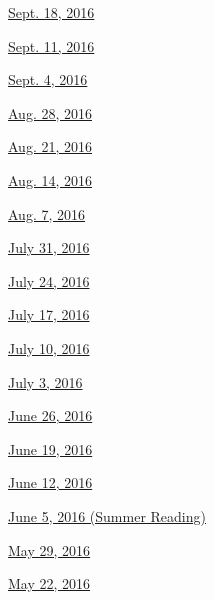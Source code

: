 \href{http://www.nytimes3xbfgragh.onion/indexes/2016/09/18/todayspaper/index.html\#bookreview}{Sept.
18, 2016}

\href{http://www.nytimes3xbfgragh.onion/indexes/2016/09/18/todayspaper/index.html\#bookreview}{Sept.
11, 2016}

\href{http://www.nytimes3xbfgragh.onion/indexes/2016/09/04/todayspaper/index.html\#bookreview}{Sept.
4, 2016}

\href{http://www.nytimes3xbfgragh.onion/indexes/2016/08/28/todayspaper/index.html\#bookreview}{Aug.
28, 2016}

\href{http://www.nytimes3xbfgragh.onion/indexes/2016/08/21/todayspaper/index.html\#bookreview}{Aug.
21, 2016}

\href{http://www.nytimes3xbfgragh.onion/indexes/2016/08/14/todayspaper/index.html\#bookreview}{Aug.
14, 2016}

\href{http://www.nytimes3xbfgragh.onion/indexes/2016/08/07/todayspaper/index.html\#bookreview}{Aug.
7, 2016}

\href{http://www.nytimes3xbfgragh.onion/indexes/2016/07/31/todayspaper/index.html\#bookreview}{July
31, 2016}

\href{http://www.nytimes3xbfgragh.onion/indexes/2016/07/24/todayspaper/index.html\#bookreview}{July
24, 2016}

\href{http://www.nytimes3xbfgragh.onion/indexes/2016/07/17/todayspaper/index.html\#bookreview}{July
17, 2016}

\href{http://www.nytimes3xbfgragh.onion/indexes/2016/07/10/todayspaper/index.html\#bookreview}{July
10, 2016}

\href{http://www.nytimes3xbfgragh.onion/indexes/2016/07/03/todayspaper/index.html\#bookreview}{July
3, 2016}

\href{http://www.nytimes3xbfgragh.onion/indexes/2016/06/26/todayspaper/index.html\#bookreview}{June
26, 2016}

\href{http://www.nytimes3xbfgragh.onion/indexes/2016/06/19/todayspaper/index.html\#bookreview}{June
19, 2016}

\href{http://www.nytimes3xbfgragh.onion/indexes/2016/06/12/todayspaper/index.html\#bookreview}{June
12, 2016}

\href{http://www.nytimes3xbfgragh.onion/indexes/2016/06/05/todayspaper/index.html\#bookreview}{June
5, 2016 (Summer Reading)}

\href{http://www.nytimes3xbfgragh.onion/indexes/2016/05/29/todayspaper/index.html\#bookreview}{May
29, 2016}

\href{http://www.nytimes3xbfgragh.onion/indexes/2016/05/22/todayspaper/index.html\#bookreview}{May
22, 2016}

